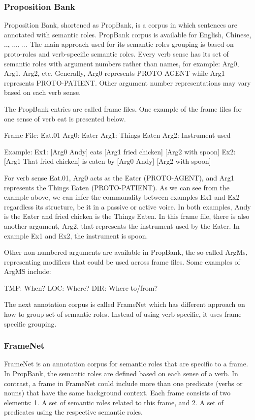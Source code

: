\subsubsection{Proposition Bank}
Proposition Bank, shortened as PropBank, is a corpus in which sentences are annotated with semantic roles. PropBank corpus is available for English, Chinese, .., ..., ... The main approach used for its semantic roles grouping is based on proto-roles and verb-specific semantic roles. Every verb sense has its set of semantic roles with argument numbers rather than names, for example: Arg0, Arg1. Arg2, etc. Generally, Arg0 represents PROTO-AGENT while Arg1 represents PROTO-PATIENT. Other argument number representations may vary based on each verb sense.

The PropBank entries are called frame files. One example of the frame files for one sense of verb eat is presented below.

Frame File:
Eat.01
Arg0: Eater
Arg1: Things Eaten
Arg2: Instrument used

Example:
Ex1: [Arg0 Andy] eats [Arg1 fried chicken] [Arg2 with spoon]
Ex2: [Arg1 That fried chicken] is eaten by [Arg0 Andy] [Arg2 with spoon]

For verb sense Eat.01, Arg0 acts as the Eater (PROTO-AGENT), and Arg1 represents the Things Eaten (PROTO-PATIENT). As we can see from the example above, we can infer the commonality between examples Ex1 and Ex2 regardless its structure, be it in a passive or active voice. In both examples, Andy is the Eater and fried chicken is the Things Eaten. In this frame file, there is also another argument, Arg2, that represents the instrument used by the Eater. In example Ex1 and Ex2, the instrument is spoon.

Other non-numbered arguments are available in PropBank, the so-called ArgMs, representing modifiers that could be used across frame files. Some examples of ArgMS include:

TMP: When?
LOC: Where?
DIR: Where to/from?

The next annotation corpus is called FrameNet which has different approach on how to group set of semantic roles. Instead of using verb-specific, it uses frame-specific grouping.

\subsubsection{FrameNet}
FrameNet is an annotation corpus for semantic roles that are specific to a frame. In PropBank, the semantic roles are defined based on each sense of a verb. In contrast, a frame in FrameNet could include more than one predicate (verbs or nouns) that have the same background context. Each frame consists of two elements: 1. A set of semantic roles related to this frame, and 2. A set of predicates using the respective semantic roles.


